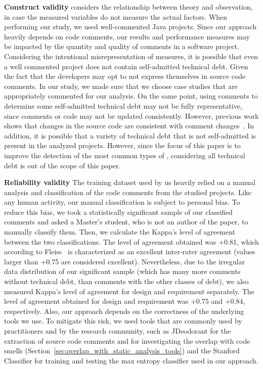 \noindent\textbf{Construct validity} considers the relationship between theory and observation, in case the measured variables do not measure the actual factors. When performing our study, we used well-commented Java projects. Since our approach heavily depends on code comments, our results and performance measures may be impacted by the quantity and quality of comments in a software project. Considering the intentional misrepresentation of measures, it is possible that even a well commented project does not contain self-admitted technical debt. Given the fact that the developers may opt to not express themselves in source code comments. In our study, we made sure that we choose case studies that are appropriately commented for our analysis. On the same point, using comments to determine some self-admitted technical debt may not be fully representative, since comments or code may not be updated consistently. However, previous work shows that changes in the source code are consistent with comment changes~\cite{Fluri2007WCRE,Potdar2014ICSME}. In addition, it is possible that a variety of technical debt that is not self-admitted is present in the analyzed projects. However, since the focus of this paper is to improve the detection of the most common types of \SATD, considering all technical debt is out of the scope of this paper.


\noindent \textbf{Reliability validity} The training dataset used by us heavily relied on a manual analysis and classification of the code comments from the studied projects. Like any human activity, our manual classification is subject to personal bias. To reduce this bias, we took a statistically significant sample of our classified comments and asked a Master's student, who is not an author of the paper, to manually classify them. Then, we calculate the Kappa's level of agreement between the two classifications. The level of agreement obtained was +0.81, which according to Fleiss~\cite{Fleiss1981measurement} is characterized as an excellent inter-rater agreement (values larger than +0.75 are considered excellent). Nevertheless, due to the irregular data distribution of our significant sample (which has many more comments without technical debt, than comments with the other classes of debt), we also measured Kappa's level of agreement for design and requirement \SATD separately. The level of agreement obtained for design and requirement \SATD was +0.75 and +0.84, respectively. Also, our approach depends on the correctness of the underlying tools we use. To mitigate this risk, we used tools that are commonly used by practitioners and by the research community, such as JDeodorant for the extraction of source code comments and for investigating the overlap with code smells (Section~\ref{sec:overlap_with_static_analysis_tools}) and the Stanford Classifier for training and testing the max entropy classifier used in our approach.



